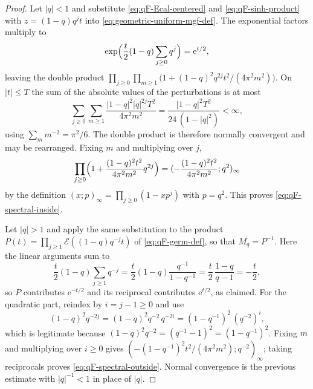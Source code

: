 \documentclass[11pt,oneside,openany]{book}
\theoremstyle{definition}
\theoremstyle{remark}
\newcommand{\poch}[3]{(#1;#2)_{#3}}
\newcommand{\e}{\mathrm e}
\newcommand{\abs}[1]{\lvert #1\rvert}
\begin{document}
\begin{proof}
Let $\abs q<1$ and substitute \eqref{eq:qF-Ecal-centered} and
\eqref{eq:qF-sinh-product} with $z=(1-q)q^jt$ into \eqref{eq:geometric-uniform-mgf-def}.  The
exponential factors multiply to
\[
 \exp\Bigl(\frac t2(1-q)\sum_{j\ge0}q^{j}\Bigr)=\e^{t/2},
\]
leaving the double product
$\prod_{j\ge0}\prod_{m\ge1}\bigl(1+(1-q)^2q^{2j}t^2/(4\pi^2m^2)\bigr)$.  On
$\abs t\le T$ the sum of the absolute values of the perturbations is at most
\[
 \sum_{j\ge0}\sum_{m\ge1}\frac{\abs{1-q}^2\abs q^{2j}T^2}{4\pi^2m^2}
 =\frac{\abs{1-q}^2T^2}{24\,(1-\abs q^2)}<\infty,
\]
using $\sum_mm^{-2}=\pi^2/6$.  The double product is therefore normally
convergent and may be rearranged.  Fixing $m$ and multiplying over $j$,
\[
 \prod_{j\ge0}\Bigl(1+\frac{(1-q)^2t^2}{4\pi^2m^2}q^{2j}\Bigr)
 =\poch{-\dfrac{(1-q)^2t^2}{4\pi^2m^2}}{q^{2}}{\infty}
\]
by the definition $(x;p)_\infty=\prod_{j\ge0}(1-xp^j)$ with $p=q^2$.  This proves
\eqref{eq:qF-spectral-inside}.

Let $\abs q>1$ and apply the same substitution to the product
$P(t)=\prod_{j\ge1}\mathcal E((1-q)q^{-j}t)$ of \eqref{eq:qF-germ-def}, so that
$M_q=P^{-1}$.  Here the linear arguments sum to
\[
 \frac t2(1-q)\sum_{j\ge1}q^{-j}
 =\frac t2(1-q)\frac{q^{-1}}{1-q^{-1}}
 =\frac t2\,\frac{1-q}{q-1}
 =-\frac t2,
\]
so $P$ contributes $\e^{-t/2}$ and its reciprocal contributes $\e^{t/2}$, as
claimed.  For the quadratic part, reindex by $i=j-1\ge0$ and use
\[
 (1-q)^2q^{-2j}=(1-q)^2q^{-2}\,q^{-2i}=(1-q^{-1})^2\,(q^{-2})^{i},
\]
which is legitimate because $(1-q)^2q^{-2}=(q^{-1}-1)^2=(1-q^{-1})^2$.  Fixing
$m$ and multiplying over $i\ge0$ gives
$\poch{-(1-q^{-1})^2t^2/(4\pi^2m^2)}{q^{-2}}{\infty}$; taking reciprocals proves
\eqref{eq:qF-spectral-outside}.  Normal convergence is the previous estimate
with $\abs q^{-1}<1$ in place of $\abs q$.
\end{proof}
\end{document}
